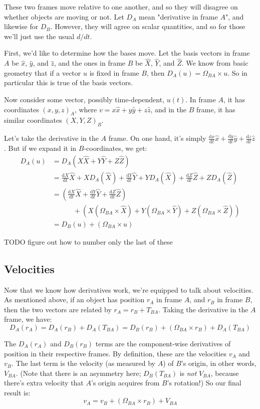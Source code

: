 \documentclass{article}
\newcommand{\dd}{\mathrm{d}}
\newcommand{\der}[2]{\frac{\dd #1}{\dd #2}}
\numberwithin{equation}{subsection}
\begin{document}
These two frames move relative to one another, and so they will disagree on whether objects are moving or not. Let $D_A$ mean "derivative in frame $A$", and likewise for $D_B$. However, they will agree on scalar quantities, and so for those we'll just use the usual $d/dt$.

First, we'd like to determine how the bases move. Let the basis vectors in frame $A$ be $\hat x$, $\hat y$, and $\hat z$, and the ones in frame $B$ be $\hat X$, $\hat Y$, and $\hat Z$. We know from basic geometry that if a vector $u$ is fixed in frame $B$, then $D_A (u) = \Omega_{BA} \times u$. So in particular this is true of the basis vectors.

Now consider some vector, possibly time-dependent, $u(t)$. In frame $A$, it has coordinates $(x, y, z)_A$, where $v = x \hat x + y \hat y + z \hat z$, and in the $B$ frame, it has similar coordinates $(X, Y, Z)_B$.

Let's take the derivative in the $A$ frame. On one hand, it's simply $\der{x}{t} \hat x + \der{y}{t} \hat y + \der{z}{t} \hat z$. But if we expand it in $B$-coordinates, we get:
\begin{align*}
D_A (u) &= D_A (X \hat X + Y \hat Y + Z \hat Z) \\
&= \der{X}{t} \hat X + X D_A (\hat X) + \der{Y}{t} \hat Y + Y D_A (\hat X) + \der{Z}{t} \hat Z + Z D_A (\hat Z) \\
&= \left( \der{X}{t} \hat X + \der{Y}{t} \hat Y + \der{Z}{t} \hat Z \right) \\
&\qquad\quad + \left( X (\Omega_{BA} \times \hat X) + Y (\Omega_{BA} \times \hat Y) + Z (\Omega_{BA} \times \hat Z) \right) \\
&= D_B (u) + (\Omega_{BA} \times u)
\end{align*}

TODO figure out how to number only the last of these

\subsection{Velocities}

Now that we know how derivatives work, we're equipped to talk about velocities. As mentioned above, if an object has position $r_A$ in frame $A$, and $r_B$ in frame $B$, then the two vectors are related by $r_A = r_B + T_{BA}$. Taking the derivative in the $A$ frame, we have:
\[ D_A (r_A) = D_A (r_B) + D_A(T_{BA}) = D_B (r_B) + (\Omega_{BA} \times r_B) + D_A (T_{BA}) \]

The $D_A (r_A)$ and $D_B (r_B)$ terms are the component-wise derivatives of position in their respective frames. By definition, these are the velocities $v_A$ and $v_B$. The last term is the velocity (as measured by $A$) of $B$'s origin, in other words, $V_{BA}$. (Note that there is an asymmetry here; $D_B (T_{BA})$ is \textit{not} $V_{BA}$, because there's extra velocity that $A$'s origin acquires from $B$'s rotation!) So our final result is:
\[ v_A = v_B + (\Omega_{BA} \times r_B) + V_{BA} \]
\end{document}
